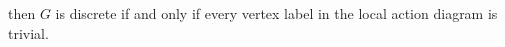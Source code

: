 \documentclass[preview]{standalone}
\begin{document}
\begin{center}
then $G$ is discrete if and only if every vertex label in the local action diagram is trivial.
\end{center}
\end{document}
